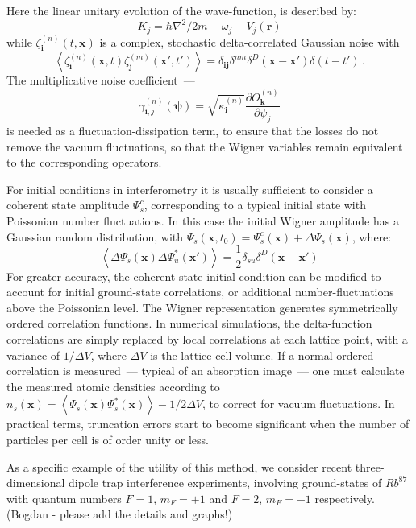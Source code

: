\documentclass[aps,prl,twocolumn,showpacs,amsmath,amssymb,superscriptaddress]{revtex4-1}
\begin{document}
Here the linear unitary evolution of the wave-function, is described by:
\begin{equation}
	K_{j} = \hbar \nabla^{2}/2m - \omega_{j} - V_{j} \left( \mathbf{r} \right)
\end{equation}
while $\zeta_{\mathbf{i}}^{(n)}(t,\mathbf{x})$ is a complex,
stochastic delta-correlated Gaussian noise with
\begin{equation}
	\left\langle
		\zeta_{\mathbf{i}}^{(n)} (\mathbf{x},t) \zeta_{\mathbf{j}}^{(m)}(\mathbf{x}',t')
	\right\rangle =
	\delta_{\mathbf{ij}} \delta^{nm} \delta^{D} \left(
		\mathbf{x} - \mathbf{x}'
	\right)
	\delta \left( t - t' \right)\,.
\end{equation}
The multiplicative noise coefficient~---
\begin{equation}
	\gamma_{\mathbf{i},j}^{(n)} \left( \boldsymbol{\psi} \right) =
	\sqrt{\kappa_{\mathbf{i}}^{(n)}}
	\frac{\partial O_{\mathbf{k}}^{(n)}}{\partial\psi_{j}}
\end{equation}
is needed as a fluctuation-dissipation term,
to ensure that the losses do not remove the vacuum fluctuations,
so that the Wigner variables remain equivalent to the corresponding operators.

For initial conditions in interferometry it is usually sufficient
to consider a coherent state amplitude $\Psi_{s}^{c}$,
corresponding to a typical initial state with Poissonian number fluctuations.
In this case the initial Wigner amplitude has a Gaussian random distribution,
with $\Psi_{s}(\mathbf{x},t_{0})=\Psi_{s}^{c}(\mathbf{x})+\Delta\Psi_{s}(\mathbf{x})$,
where:
\begin{equation}
	\left\langle
		\Delta\Psi_{s}(\mathbf{x}) \Delta\Psi_{u}^{*}(\mathbf{x}')
	\right\rangle =
	\frac{1}{2} \delta_{su} \delta^{D} \left( \mathbf{x} - \mathbf{x}'\right)
\end{equation}
For greater accuracy, the coherent-state initial condition
can be modified to account for initial ground-state correlations,
or additional number-fluctuations above the Poissonian level.
The Wigner representation generates symmetrically ordered correlation functions.
In numerical simulations, the delta-function correlations are simply replaced by
local correlations at each lattice point,
with a variance of $1/\Delta V$, where $\Delta V$ is the lattice cell volume.
If a normal ordered correlation is measured~--- typical of an absorption image~---
one must calculate the measured atomic densities according to
$n_{s} \left( \mathbf{x} \right) = \left\langle
	\Psi_{s}(\mathbf{x}) \Psi_{s}^{*}(\mathbf{x})
\right\rangle -1/2\Delta V$,
to correct for vacuum fluctuations.
In practical terms, truncation errors start to become significant
when the number of particles per cell is of order unity or less.

As a specific example of the utility of this method,
we consider recent three-dimensional dipole trap interference experiments,
involving ground-states of $Rb^{87}$ with quantum numbers $F=1,\, m_{F}=+1$
and $F=2,\, m_{F}=-1$ respectively.
(Bogdan - please add the details and graphs!)


\end{document}

